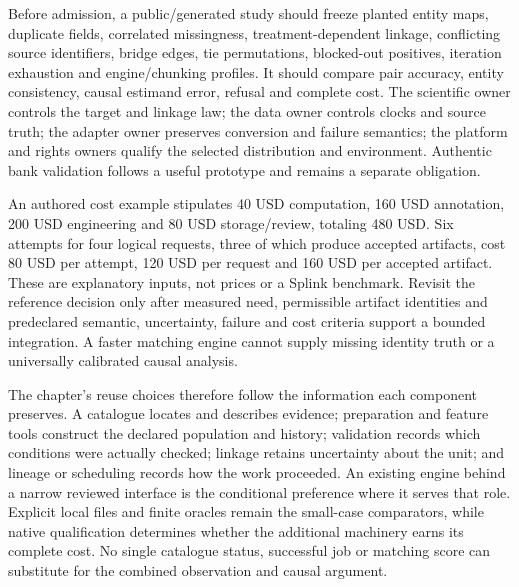 Before admission, a public/generated study should freeze planted entity maps, duplicate fields, correlated missingness, treatment-dependent linkage, conflicting source identifiers, bridge edges, tie permutations, blocked-out positives, iteration exhaustion and engine/chunking profiles. It should compare pair accuracy, entity consistency, causal estimand error, refusal and complete cost. The scientific owner controls the target and linkage law; the data owner controls clocks and source truth; the adapter owner preserves conversion and failure semantics; the platform and rights owners qualify the selected distribution and environment. Authentic bank validation follows a useful prototype and remains a separate obligation.~\citep{exec24_splink_contract}

An authored cost example stipulates 40 USD computation, 160 USD annotation, 200 USD engineering and 80 USD storage/review, totaling 480 USD. Six attempts for four logical requests, three of which produce accepted artifacts, cost 80 USD per attempt, 120 USD per request and 160 USD per accepted artifact. These are explanatory inputs, not prices or a Splink benchmark. Revisit the reference decision only after measured need, permissible artifact identities and predeclared semantic, uncertainty, failure and cost criteria support a bounded integration. A faster matching engine cannot supply missing identity truth or a universally calibrated causal analysis.~\citep{exec24_splink_contract}

The chapter's reuse choices therefore follow the information each component preserves. A catalogue locates and describes evidence; preparation and feature tools construct the declared population and history; validation records which conditions were actually checked; linkage retains uncertainty about the unit; and lineage or scheduling records how the work proceeded. An existing engine behind a narrow reviewed interface is the conditional preference where it serves that role. Explicit local files and finite oracles remain the small-case comparators, while native qualification determines whether the additional machinery earns its complete cost. No single catalogue status, successful job or matching score can substitute for the combined observation and causal argument.

